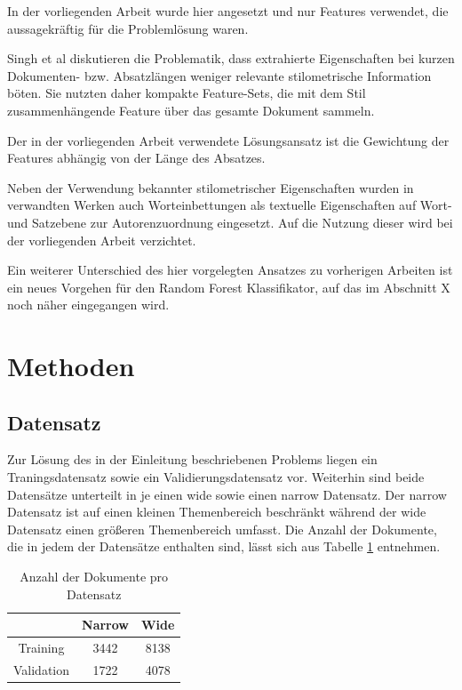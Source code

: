 \documentclass[conference]{IEEEtran}
\begin{document}
In der vorliegenden Arbeit wurde hier angesetzt und nur Features verwendet, die aussagekräftig für die Problemlösung waren. 

Singh et al \cite[S.4]{vw_b8} diskutieren die Problematik, dass extrahierte Eigenschaften bei kurzen Dokumenten- bzw. Absatzlängen weniger relevante stilometrische Information böten. Sie nutzten daher kompakte Feature-Sets, die mit dem Stil zusammenhängende Feature über das gesamte Dokument sammeln.
 
Der in der vorliegenden Arbeit verwendete Lösungsansatz ist die Gewichtung der Features abhängig von der Länge des Absatzes. 

Neben der Verwendung bekannter stilometrischer Eigenschaften wurden in verwandten Werken auch Worteinbettungen als textuelle Eigenschaften auf Wort- \cite{vw_b9} und Satzebene \cite{vw_b2} zur Autorenzuordnung eingesetzt. Auf die Nutzung dieser wird bei der vorliegenden Arbeit verzichtet.

Ein weiterer Unterschied des hier vorgelegten Ansatzes zu vorherigen Arbeiten ist ein neues Vorgehen für den Random Forest Klassifikator, auf das im Abschnitt X noch näher eingegangen wird.

\section{Methoden}
	\subsection{Datensatz}
		Zur Lösung des in der Einleitung beschriebenen Problems liegen ein Traningsdatensatz sowie ein Validierungsdatensatz vor. Weiterhin sind beide Datensätze unterteilt in je einen wide sowie einen narrow Datensatz. Der narrow Datensatz ist auf einen kleinen Themenbereich beschränkt während der wide Datensatz einen größeren Themenbereich umfasst. Die Anzahl der Dokumente, die in jedem der Datensätze enthalten sind, lässt sich aus Tabelle \ref{tab:ds_1} entnehmen.
		\begin{table}[htbp]
			\caption{Anzahl der Dokumente pro Datensatz}
			\begin{center}
				\begin{tabular}{|c|c|c|}
					\hline
					& Narrow & Wide \\
					\hline 
					Training & 3442 & 8138 \\
					\hline
					Validation & 1722 & 4078 \\
					\hline 
				\end{tabular}
				\label{tab:ds_1}
			\end{center}
		\end{table}
	
\end{document}
